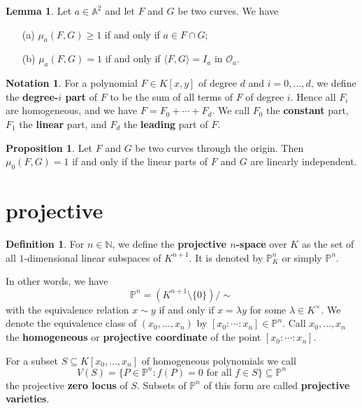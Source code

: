 \documentclass[12pt]{article}
\theoremstyle{definition}
\newtheorem{lemma}{Lemma}
\newtheorem{proposition}{Proposition}
\newtheorem{definition}{Definition}
\newtheorem{notation}{Notation}
\newcommand{\N}{\mathbb{N}}
\newcommand{\<}{\langle}
\renewcommand{\>}{\rangle}
\newcommand{\A}{\mathbb{A}}
\renewcommand{\P}{\mathbb{P}}
\renewcommand{\O}{\mathscr{O}}
\begin{document}
\begin{lemma}
    Let $a \in \A^2$ and let $F$ and $G$ be two curves. We have
    \begin{itemize}
        \item[(a)] $\mu_a(F, G) \geq 1$ if and only if $a \in F \cap G$;
        \item[(b)] $\mu_a(F, G) = 1$ if and only if $\<F, G\> = I_a$ in $\O_a$.
    \end{itemize}
\end{lemma}

\begin{notation}
    For a polynomial $F \in K[x, y]$ of degree $d$ and $i = 0, \dots, d$, we define the \textbf{degree-$i$ part} of $F$ to be the sum of all terms of $F$ of degree $i$. Hence all $F_i$ are homogeneous, and we have $F = F_0 + \cdots + F_d$. We call $F_0$ the \textbf{constant} part, $F_1$ the \textbf{linear} part, and $F_d$ the \textbf{leading} part of $F$.
\end{notation}


\begin{proposition}
    Let $F$ and $G$ be two curves through the origin. Then $\mu_0(F, G) = 1$ if and only if the linear parts of $F$ and $G$ are linearly independent.
\end{proposition}


\section{projective}

\begin{definition}
    For $n \in \N$, we define the \textbf{projective $n$-space} over $K$ as the set of all $1$-dimensional linear subspaces of $K^{n+1}$. It is denoted by $\P_K^n$ or simply $\P^n$.

    In other words, we have
    \[
        \P^n = (K^{n+1} \setminus \{0\}) / \sim
    \]
    with the equivalence relation $x \sim y$ if and only if $x = \lambda y$ for some $\lambda \in K^\times$. We denote the equivalence class of $(x_0, \dots, x_n)$ by $[x_0 : \cdots : x_n] \in \P^n$. Call $x_0, \dots, x_n$ the \textbf{homogeneous} or \textbf{projective coordinate} of the point $[x_0 : \cdots : x_n]$.

    For a subset $S \subseteq K[x_0, \dots, x_n]$ of homogeneous polynomials we call
    \[
        V(S) = \{P \in \P^n : f(P) = 0 \text{ for all } f \in S\} \subseteq \P^n
    \]
    the projective \textbf{zero locus} of $S$. Subsets of $\P^n$ of this form are called \textbf{projective varieties}.
\end{definition}
\end{document}
